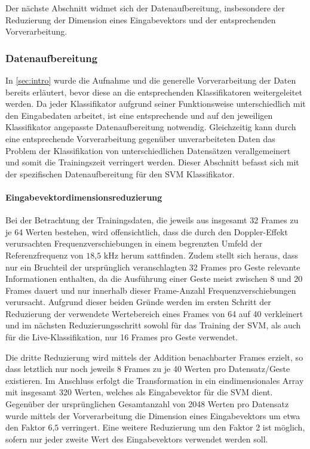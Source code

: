 Der nächste Abschnitt widmet sich der Datenaufbereitung, insbesondere der Reduzierung der Dimension eines Eingabevektors und der entsprechenden Vorverarbeitung.

\subsubsection{Datenaufbereitung}\label{sec:svm_data} 
In \autoref{sec:intro} wurde die Aufnahme und die generelle Vorverarbeitung der Daten bereits erläutert, bevor diese an die entsprechenden Klassifikatoren weitergeleitet werden.
Da jeder Klassifikator aufgrund seiner Funktionsweise unterschiedlich mit den Eingabedaten arbeitet, ist eine entsprechende und auf den jeweiligen Klassifikator angepasste Datenaufbereitung notwendig.
Gleichzeitig kann durch eine entsprechende Vorverarbeitung gegenüber unverarbeiteten Daten das Problem der Klassifikation von unterschiedlichen Datensätzen verallgemeinert und somit die Trainingszeit verringert werden.
Dieser Abschnitt befasst sich mit der spezifischen Datenaufbereitung für den \ac{SVM} Klassifikator.

\paragraph{Eingabevektordimensionsreduzierung}\label{sec:svm_reduce}$\;$ \\
Bei der Betrachtung der Trainingsdaten, die jeweils aus insgesamt 32 Frames zu je 64 Werten bestehen, wird offensichtlich, dass die durch den Doppler-Effekt verursachten Frequenzverschiebungen in einem begrenzten Umfeld der Referenzfrequenz von $18\text{,}5\text{ kHz}$ herum sattfinden.
Zudem stellt sich heraus, dass nur ein Bruchteil der ursprünglich veranschlagten 32 Frames pro Geste relevante Informationen enthalten, da die Ausführung einer Geste meist zwischen 8 und 20 Frames dauert und nur innerhalb dieser Frame-Anzahl Frequenzverschiebungen verursacht.
Aufgrund dieser beiden Gründe werden im ersten Schritt der Reduzierung der verwendete Wertebereich eines Frames von 64 auf 40 verkleinert und im nächsten Reduzierungsschritt sowohl für das Training der \ac{SVM}, als auch für die Live-Klassifikation, nur 16 Frames pro Geste verwendet. 

Die dritte Reduzierung wird mittels der Addition benachbarter Frames erzielt, so dass letztlich nur noch jeweils 8 Frames zu je 40 Werten pro Datensatz/Geste existieren.
Im Anschluss erfolgt die Transformation in ein eindimensionales Array mit insgesamt 320 Werten, welches als Eingabevektor für die \ac{SVM} dient.
Gegenüber der ursprünglichen Gesamtanzahl von 2048 Werten pro Datensatz wurde mittels der Vorverarbeitung die Dimension eines Eingabevektors um etwa den Faktor $6\text{,}5$ verringert.
Eine weitere Reduzierung um den Faktor 2 ist möglich, sofern nur jeder zweite Wert des Eingabevektors verwendet werden soll.

